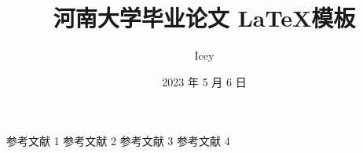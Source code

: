 \documentclass{HENU-Bachelor-LaTeX}
\begin{document}

\title{河南大学毕业论文 \LaTeX 模板}            %
\author{Icey}                     %
\date{2023 年 5 月 6 日}          %


\maketitle
\frontmatter
{}            %

\thispagestyle{empty}
\tableofcontents
\thispagestyle{empty}

\mainmatter %
 
 
 
%
\appendix
\cleardoublepage{}

%

\begin{thebibliography}{99}
   参考文献 1
   参考文献 2
   参考文献 3
   参考文献 4
\end{thebibliography}

\cleardoublepage
\end{document}
